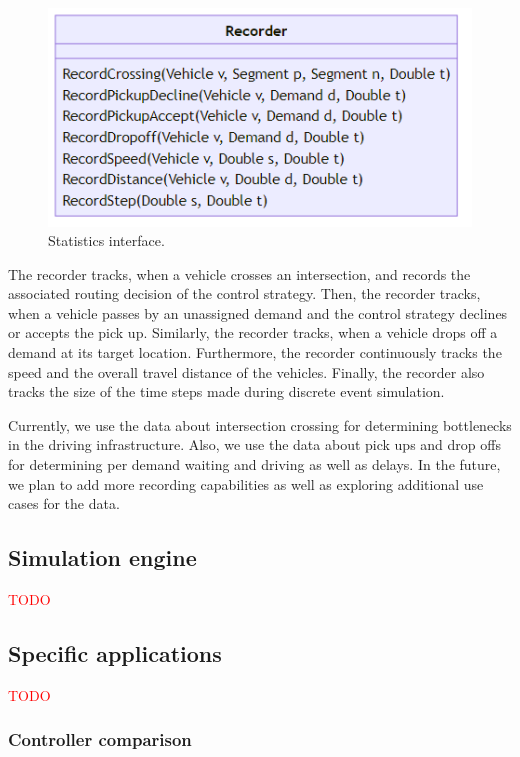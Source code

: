\documentclass[10pt,twocolumn]{article}
\begin{document}
\begin{figure}[!ht]
    \centering
    \includegraphics[scale=0.4]{../../diagrams/statistics/classes-v2.png}
    \caption{Statistics interface.}
    \label{fig:statistics-interface}
\end{figure}

The recorder tracks, when a vehicle crosses an intersection, and records the associated routing decision of the control strategy.
Then, the recorder tracks, when a vehicle passes by an unassigned demand and the control strategy declines or accepts the pick up.
Similarly, the recorder tracks, when a vehicle drops off a demand at its target location.
Furthermore, the recorder continuously tracks the speed and the overall travel distance of the vehicles.
Finally, the recorder also tracks the size of the time steps made during discrete event simulation.

Currently, we use the data about intersection crossing for determining bottlenecks in the driving infrastructure.
Also, we use the data about pick ups and drop offs for determining per demand waiting and driving as well as delays.
In the future, we plan to add more recording capabilities as well as exploring additional use cases for the data.

\subsection{Simulation engine}
\label{sec:simulation-engine}

\textcolor{red}{TODO}

\subsection{Specific applications}
\label{sec:application}

\textcolor{red}{TODO}

\subsubsection{Controller comparison}
\label{sec:controller-comparison}
\end{document}
